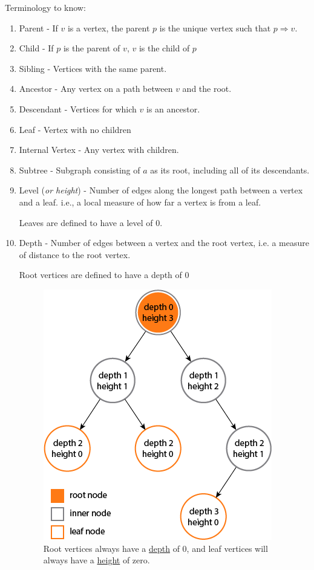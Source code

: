 \documentclass[a4paper,10pt]{report}
\begin{document}
Terminology to know:
\begin{enumerate}
	\item Parent - If $v$ is a vertex, the parent $p$ is the unique vertex such that $p\Rightarrow v$.
	\item Child - If $p$ is the parent of $v$, $v$ is the child of $p$
	\item Sibling - Vertices with the same parent.
	\item Ancestor - Any vertex on a path between $v$ and the root.
	\item Descendant - Vertices for which $v$ is an ancestor.
	\item Leaf - Vertex with no children
	\item Internal Vertex - Any vertex with children.
	\item Subtree - Subgraph consisting of $a$ as its root, including all of its descendants.
	\item Level (\textit{or height}) - Number of edges along the longest path between a vertex and a leaf.
	i.e., a local measure of how far a vertex is from a leaf.

	Leaves are defined to have a level of 0.

	\item Depth - Number of edges between a vertex and the root vertex,
	i.e. a measure of distance to the root vertex.

	Root vertices are defined to have a depth of 0

		\begin{figure}[h!]
		\begin{centering}
		\begin{center}
		\includegraphics[width=.5\linewidth]{./height-depth.png}
		\caption{Root vertices always have a \underline{depth} of 0, and leaf vertices will always have a \underline{height} of zero. }
		\label{fig:??????}
		\end{center}
		\par\end{centering}
		\end{figure}
\end{enumerate}
\end{document}
